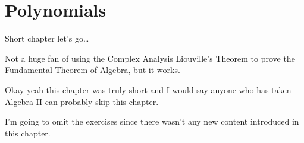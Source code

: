 \chapter{Polynomials}

Short chapter let's go\dots

Not a huge fan of using the Complex Analysis Liouville's Theorem to prove the Fundamental Theorem of Algebra, but it works.

Okay yeah this chapter was truly short and I would say anyone who has taken Algebra II can probably skip this chapter.

I'm going to omit the exercises since there wasn't any new content introduced in this chapter.